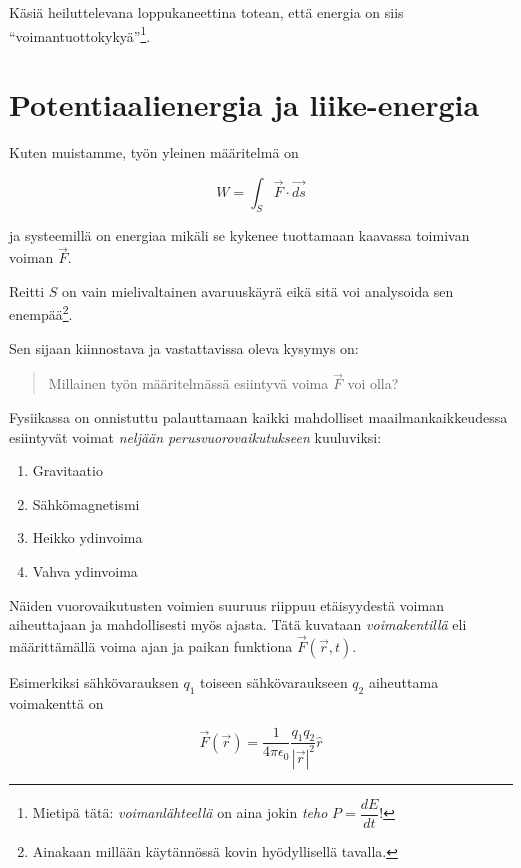 \documentclass[12pt,a4paper,finnish]{book}
\begin{document}
Käsiä heiluttelevana loppukaneettina totean, että energia on siis ``voimantuottokykyä''\footnote{
Mietipä tätä: \textit{voimanlähteellä} on aina jokin \textit{teho} $P = \dfrac{dE}{dt}$!}.

\section{Potentiaalienergia ja liike-energia}

Kuten muistamme, työn yleinen määritelmä on

\begin{equation}
 W = \int_S \vec{F} \cdot \vec{ds}
\end{equation}

ja systeemillä on energiaa mikäli se kykenee tuottamaan kaavassa toimivan voiman $\vec{F}$.

Reitti $S$ on vain mielivaltainen avaruuskäyrä eikä sitä voi analysoida sen enempää\footnote{
Ainakaan millään käytännössä kovin hyödyllisellä tavalla.}.

Sen sijaan kiinnostava ja vastattavissa oleva kysymys on:

\begin{quote}
 Millainen työn määritelmässä esiintyvä voima $\vec{F}$ voi olla? 
\end{quote}

Fysiikassa on onnistuttu palauttamaan kaikki mahdolliset maailmankaikkeudessa esiintyvät voimat 
\textit{neljään perusvuorovaikutukseen} kuuluviksi:

\begin{enumerate}
 \item Gravitaatio
 \item Sähkömagnetismi
 \item Heikko ydinvoima
 \item Vahva ydinvoima
\end{enumerate}

Näiden vuorovaikutusten voimien suuruus riippuu etäisyydestä voiman aiheuttajaan ja mahdollisesti myös ajasta. 
Tätä kuvataan \textit{voimakentillä} eli määrittämällä voima ajan ja paikan funktiona $\vec{F}(\vec{r}, t)$. 

Esimerkiksi sähkövarauksen $q_1$ toiseen sähkövaraukseen $q_2$ aiheuttama voimakenttä on

\begin{equation}
 \vec{F}(\vec{r}) = \frac{1}{4\pi\epsilon_0}\frac{q_1q_2}{|\vec{r}|^2}\hat{r}
\end{equation}
\end{document}
